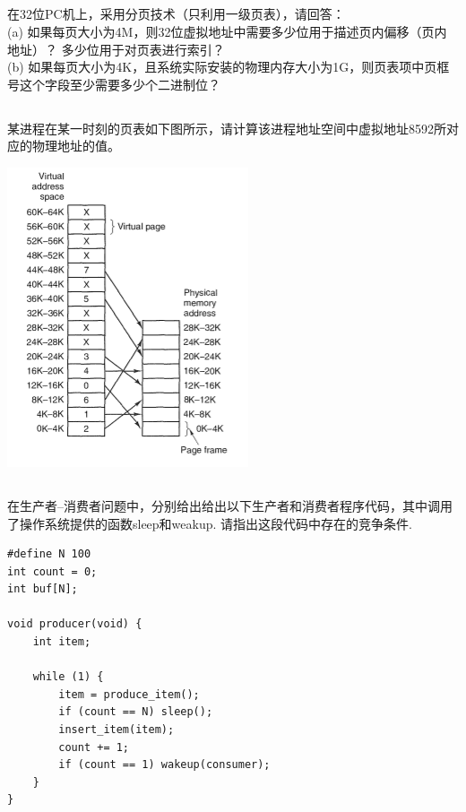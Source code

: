 \documentclass[a4paper,11pt]{article}
\begin{document}
\begin{CJK*}{UTF8}{gbsn}
\subsection{}
在32位PC机上，采用分页技术（只利用一级页表），请回答： \\%
(a) 如果每页大小为4M，则32位虚拟地址中需要多少位用于描述页内偏移（页内地址）？ 多少位用于对页表进行索引？\\
(b) 如果每页大小为4K，且系统实际安装的物理内存大小为1G，则页表项中页框号这个字段至少需要多少个二进制位？
\\[1in]

\subsection{}
某进程在某一时刻的页表如下图所示，请计算该进程地址空间中虚拟地址8592所对应的物理地址的值。

\includegraphics{vm.png}
\\[1in]

\newpage
\subsection{}
在生产者--消费者问题中，分别给出给出以下生产者和消费者程序代码，其中调用了操作系统提供的函数sleep和weakup.
请指出这段代码中存在的竞争条件.

%
\begin{verbatim}
#define N 100
int count = 0;
int buf[N];

void producer(void) {
    int item;

    while (1) {
        item = produce_item();
        if (count == N) sleep();
        insert_item(item);
        count += 1;
        if (count == 1) wakeup(consumer);
    }
}


\end{verbatim}
\end{CJK*}
\end{document}
